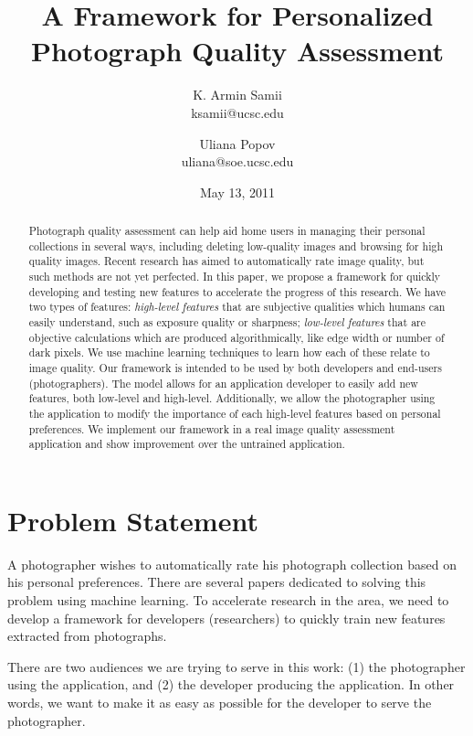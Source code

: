 \documentclass[11pt,letter]{article}
\title{A Framework for Personalized Photograph Quality Assessment}
\author{
K. Armin Samii \\
ksamii@ucsc.edu
\and
Uliana Popov \\
uliana@soe.ucsc.edu}
\date{May 13, 2011}
\begin{document}
\maketitle
\begin{abstract}
Photograph quality assessment can help aid home users in managing their personal collections in several ways, including deleting low-quality images and browsing for high quality images. Recent research has aimed to automatically rate image quality, but such methods are not yet perfected. In this paper, we propose a framework for quickly developing and testing new features to accelerate the progress of this research. We have two types of features: \textit{high-level features} that are subjective qualities which humans can easily understand, such as exposure quality or sharpness; \textit{low-level features} that are objective calculations which are produced algorithmically, like edge width or number of dark pixels. We use machine learning techniques to learn how each of these relate to image quality. 
Our framework is intended to be used by both developers and end-users (photographers). 
The model allows for an application developer to easily add new features, both low-level and high-level. Additionally, we allow the photographer using the application to modify the importance of each high-level features based on personal preferences.
We implement our framework in a real image quality assessment application and show improvement over the untrained application.

\end{abstract}

\section{Problem Statement}
A photographer wishes to automatically rate his photograph collection based on his personal preferences. There are several papers dedicated to solving this problem using machine learning\cite{springerlink:10.1007/11744078_23}\cite{springerlink:10.1007/978-3-642-10543-2_23}\cite{Yeh:2010:PPR:1873951.1873963}. To accelerate research in the area, we need to develop a framework for developers (researchers) to quickly train new features extracted from photographs.

There are two audiences we are trying to serve in this work: (1) the photographer using the application, and (2) the developer producing the application. In other words, we want to make it as easy as possible for the developer to serve the photographer.
\end{document}
